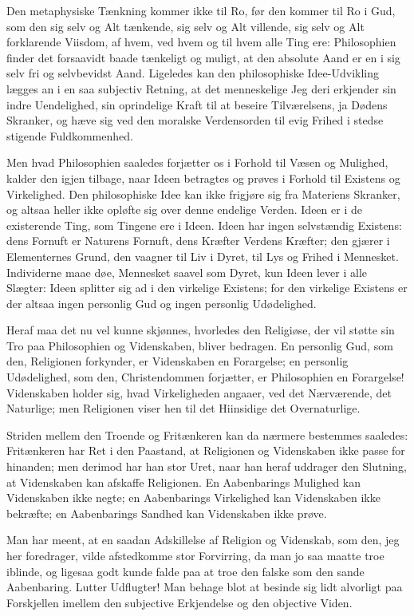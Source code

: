 \documentclass[12pt,a4paper]{book}
\newcommand{\opage}[1]{\marginnote{\footnotesize\textit{[#1]}}}
\begin{document}
Den metaphysiske Tænkning kommer ikke til Ro, før den kommer til Ro i
Gud, som den sig selv og Alt tænkende, sig selv og Alt villende, sig selv
og Alt forklarende Viisdom, af hvem, ved hvem og til hvem alle Ting ere:
Philosophien finder det forsaavidt baade tænkeligt og muligt, at den
absolute Aand er en i sig selv fri og selvbevidst Aand. Ligeledes kan
den philosophiske Idee-Udvikling lægges an i en saa subjectiv Retning, at
det menneskelige Jeg deri erkjender sin indre Uendelighed, sin
oprindelige Kraft til at beseire Tilværelsens, ja Dødens Skranker, og
hæve sig ved den moralske Verdensorden til evig Frihed i stedse stigende
Fuldkommenhed.

Men hvad Philosophien saaledes forjætter os i Forhold til Væsen og
Mulighed, kalder den igjen tilbage, naar Ideen betragtes og prøves i
Forhold til Existens og Virkelighed. Den philosophiske Idee kan ikke
frigjøre sig fra Materiens Skranker,
\opage{89} og altsaa heller ikke opløfte sig over denne endelige Verden. Ideen er i
de existerende Ting, som Tingene ere i Ideen. Ideen har ingen
selvstændig Existens: dens Fornuft er Naturens Fornuft, dens Kræfter
Verdens Kræfter; den gjærer i Elementernes Grund, den vaagner til Liv i
Dyret, til Lys og Frihed i Mennesket. Individerne maae døe, Mennesket
saavel som Dyret, kun Ideen lever i alle Slægter: Ideen splitter sig ad i
den virkelige Existens; for den virkelige Existens er der altsaa ingen
personlig Gud og ingen personlig Udødelighed.

Heraf maa det nu vel kunne skjønnes, hvorledes den Religiøse, der vil
støtte sin Tro paa Philosophien og Videnskaben, bliver bedragen. En
personlig Gud, som den, Religionen forkynder, er Videnskaben en
Forargelse; en personlig Udødelighed, som den, Christendommen forjætter,
er Philosophien en Forargelse! Videnskaben holder sig, hvad
Virkeligheden angaaer, ved det Nærværende, det Naturlige; men Religionen
viser hen til det Hiinsidige det Overnaturlige.

Striden mellem den Troende og Fritænkeren kan da nærmere bestemmes
saaledes: Fritænkeren har Ret i den Paastand, at Religionen og
Videnskaben ikke passe for hinanden; men derimod har han stor Uret, naar
han heraf uddrager den Slutning, at Videnskaben kan afskaffe Religionen.
En Aabenbarings Mulighed kan Videnskaben ikke negte; en Aabenbarings
Virkelighed kan Videnskaben ikke bekræfte; en Aabenbarings Sandhed kan
Videnskaben ikke prøve.

Man har meent, at en saadan Adskillelse af Religion og Videnskab, som
den, jeg her foredrager, vilde afstedkomme stor Forvirring, da man jo saa
maatte troe iblinde, og ligesaa godt kunde falde paa at troe den falske
som den sande Aabenbaring. Lutter Udflugter! Man behage blot at besinde
sig lidt alvorligt paa Forskjellen imellem den subjective Erkjendelse og
den objective Viden.
\end{document}
